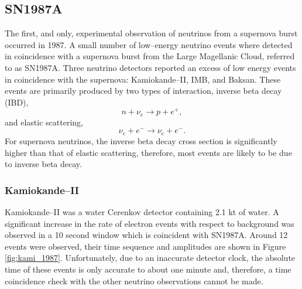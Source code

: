 \subsection{SN1987A}

The first, and only, experimental observation of neutrinos from a supernova
burst occurred in 1987. A small number of low--energy neutrino events where
detected in coincidence with a supernova burst from the Large Magellanic Cloud,
referred to as SN1987A. Three neutrino detectors reported an excess of low
energy events in coincidence with the supernova: Kamiokande--II, IMB, and 
Baksan. These events are primarily produced by two types of interaction, inverse
beta decay (IBD),
\begin{equation}
	n + \nu_e \rightarrow p + e^+,
\end{equation}
and elastic scattering,
\begin{equation}
	\nu_e + e^- \rightarrow \nu_e + e^-.
\end{equation}
For supernova neutrinos, the inverse beta decay cross section is significantly 
higher than that of elastic scattering, therefore, most events are likely to be
due to inverse beta decay.

\subsubsection{Kamiokande--II}
Kamiokande--II was a water Cerenkov detector containing 2.1 kt of water. A
significant increase in the rate of electron events with respect to background
was observed in a 10 second window which is coincident with 
SN1987A\cite{Hirata:1987hu}. Around 12 events were observed, their time sequence
and amplitudes are shown in Figure \ref{fig:kami_1987}. Unfortunately, due to 
an inaccurate detector clock, the absolute time of these events is only 
accurate to about one minute and, therefore, a time coincidence check with the 
other neutrino observations cannot be made.

